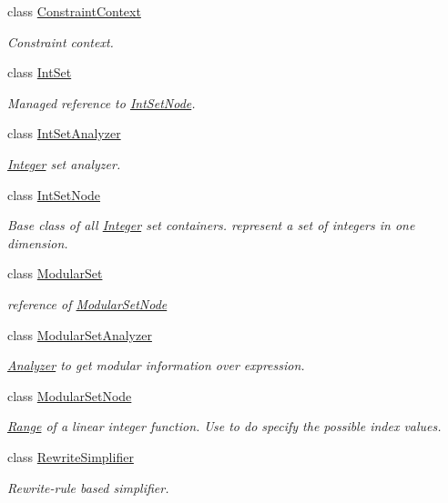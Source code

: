 \begin{DoxyCompactItemize}
class \hyperlink{classtvm_1_1arith_1_1ConstraintContext}{Constraint\+Context}
\begin{DoxyCompactList}\small\item\em Constraint context. \end{DoxyCompactList}\item 
class \hyperlink{classtvm_1_1arith_1_1IntSet}{Int\+Set}
\begin{DoxyCompactList}\small\item\em Managed reference to \hyperlink{classtvm_1_1arith_1_1IntSetNode}{Int\+Set\+Node}. \end{DoxyCompactList}\item 
class \hyperlink{classtvm_1_1arith_1_1IntSetAnalyzer}{Int\+Set\+Analyzer}
\begin{DoxyCompactList}\small\item\em \hyperlink{classtvm_1_1Integer}{Integer} set analyzer. \end{DoxyCompactList}\item 
class \hyperlink{classtvm_1_1arith_1_1IntSetNode}{Int\+Set\+Node}
\begin{DoxyCompactList}\small\item\em Base class of all \hyperlink{classtvm_1_1Integer}{Integer} set containers. represent a set of integers in one dimension. \end{DoxyCompactList}\item 
class \hyperlink{classtvm_1_1arith_1_1ModularSet}{Modular\+Set}
\begin{DoxyCompactList}\small\item\em reference of \hyperlink{classtvm_1_1arith_1_1ModularSetNode}{Modular\+Set\+Node} \end{DoxyCompactList}\item 
class \hyperlink{classtvm_1_1arith_1_1ModularSetAnalyzer}{Modular\+Set\+Analyzer}
\begin{DoxyCompactList}\small\item\em \hyperlink{classtvm_1_1arith_1_1Analyzer}{Analyzer} to get modular information over expression. \end{DoxyCompactList}\item 
class \hyperlink{classtvm_1_1arith_1_1ModularSetNode}{Modular\+Set\+Node}
\begin{DoxyCompactList}\small\item\em \hyperlink{classtvm_1_1Range}{Range} of a linear integer function. Use to do specify the possible index values. \end{DoxyCompactList}\item 
class \hyperlink{classtvm_1_1arith_1_1RewriteSimplifier}{Rewrite\+Simplifier}
\begin{DoxyCompactList}\small\item\em Rewrite-\/rule based simplifier. \end{DoxyCompactList}\end{DoxyCompactItemize}
